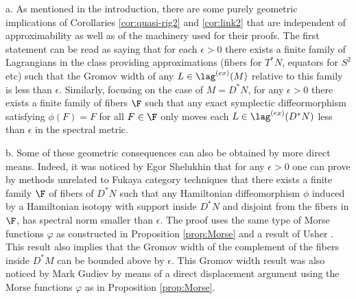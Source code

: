 \begin{rem}\label{rem:direct_cor}
 a. As mentioned in the introduction,  there are some purely geometric implications of  Corollaries \ref{cor:quasi-rig2} and \ref{cor:link2} that are independent of approximability as well as of
 the machinery used for their proofs.  The first statement can be  read as saying that for each $\epsilon>0$ there exists a finite  family of Lagrangians in the class providing approximations (fibers for $T^{\ast}N$, equators for $S^{2}$ etc)   such that the Gromov width of any $L\in \lag^{(ex)}(M)$ relative to this family is less than $\epsilon$. Similarly, focusing on the case of $M=D^{\ast}N$, for any $\epsilon>0$ there exists a finite family of fibers $\F$ such that any exact symplectic diffeormorphism  satisfying $\phi(F)=F$ for all $F\in\F$  only moves each $L\in \lag^{(ex)}(D^{\ast}N)$ less than $\epsilon$ in the spectral metric. 
 
 b. Some of these geometric consequences can also be obtained by more direct means. Indeed, 
 it was noticed by Egor Shelukhin that for any $\epsilon>0$ one can prove by methods unrelated to Fukaya category techniques  that there exists a finite family $\F$ of fibers of $D^{\ast}N$ such that any  Hamiltonian diffeomorphism $\phi$ induced by a Hamiltonian isotopy with support inside $D^{\ast}N$ and disjoint from the fibers in $\F$, has spectral 
 norm smaller than $\epsilon$.  The proof uses the same type of  Morse functions $\varphi$ as constructed in Proposition \ref{prop:Morse} and a result of Usher \cite{Ush10}. This result also implies
 that the Gromov width of the complement of the fibers inside $D^{\ast}M$ can be bounded above by $\epsilon$. This Gromov width  result was also noticed by Mark Gudiev by means of a direct displacement argument using the Morse functions $\varphi$ as in Proposition \ref{prop:Morse}.
\end{rem}

